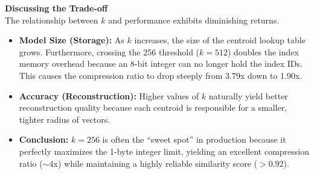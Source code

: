 \documentclass[twoside, 10pt]{article}
\begin{document}
\noindent\textbf{Discussing the Trade-off} \\
The relationship between $k$ and performance exhibits diminishing returns.

\begin{itemize}
    \item \textbf{Model Size (Storage):} As $k$ increases, the size of the centroid lookup table grows. Furthermore, crossing the 256 threshold ($k=512$) doubles the index memory overhead because an 8-bit integer can no longer hold the index IDs. This causes the compression ratio to drop steeply from 3.79x down to 1.90x.
    \item \textbf{Accuracy (Reconstruction):} Higher values of $k$ naturally yield better reconstruction quality because each centroid is responsible for a smaller, tighter radius of vectors.
    \item \textbf{Conclusion:} $k=256$ is often the ``sweet spot'' in production because it perfectly maximizes the 1-byte integer limit, yielding an excellent compression ratio ($\sim 4$x) while maintaining a highly reliable similarity score ($> 0.92$).
\end{itemize}
\end{document}
